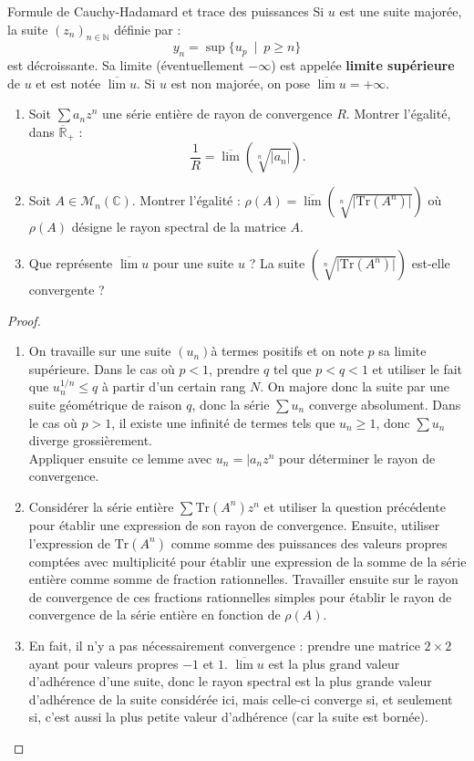 \documentclass[french]{book}
\newcommand{\N}{\mathbb{N}}
\newcommand{\R}{\mathbb{R}}
\newcommand{\C}{\mathbb{C}}
\newcommand{\Tr}{\text{Tr}}
\theoremstyle{definition}
\theoremstyle{remark}
\begin{document}
\begin{exo}[1]{Formule de Cauchy-Hadamard et trace des puissances}
	Si $u$ est une suite majorée, la suite $(z_n)_{n\in\N}$ définie par : $$y_n=\sup\{u_p\ \mid\ p\geqslant n\}$$ est décroissante. Sa limite (éventuellement $-\infty$) est appelée \textbf{limite supérieure} de $u$ et est notée $\overline{\lim}u$.	Si $u$ est non majorée, on pose $\overline{\lim}u=+\infty$.
	\begin{enumerate}
		\item Soit $\displaystyle\sum a_n z^n$ une série entière de rayon de convergence $R$. Montrer l'égalité, dans $\overline{\R}_+$ :
		$$\frac{1}{R}=\overline{\lim}(\sqrt[n]{\lvert a_n\rvert}).$$
		\item Soit $A\in\mathcal{M}_n(\C)$. Montrer l'égalité :
		$\rho(A)=\overline{\lim}(\sqrt[n]{\lvert\Tr(A^n)\rvert})$ où $\rho(A)$ désigne le rayon spectral de la matrice $A$.
		\item Que représente $\overline{\lim}u$ pour une suite $u$ ? La suite $\left(\sqrt[n]{\lvert\Tr(A^n)\rvert}\right)$ est-elle convergente ?
	\end{enumerate}
\end{exo}
\begin{proof}
	\begin{enumerate}
		\item On travaille sur une suite $(u_n)$à termes positifs et on note $p$ sa limite supérieure. Dans le cas où $p<1$, prendre $q$ tel que $p<q<1$ et utiliser le fait que $u_n^{1/n}\leqslant q$ à partir d'un certain rang $N$. On majore donc la suite par une suite géométrique de raison $q$, donc la série $\displaystyle\sum u_n$ converge absolument. Dans le cas où $p>1$, il existe une infinité de termes tels que $u_n\geqslant 1$, donc $\displaystyle\sum u_n$ diverge grossièrement. \\
		Appliquer ensuite ce lemme avec $u_n=\lvert a_n z^n$ pour déterminer le rayon de convergence.
		\item Considérer la série entière $\displaystyle\sum\Tr(A^n)z^n$ et utiliser la question précédente pour établir une expression de son rayon de convergence. Ensuite, utiliser l'expression de $\Tr(A^n)$ comme somme des puissances des valeurs propres comptées avec multiplicité pour établir une expression de la somme de la série entière comme somme de fraction rationnelles. Travailler ensuite sur le rayon de convergence de ces fractions rationnelles simples pour établir le rayon de convergence de la série entière en fonction de $\rho(A)$.
		\item En fait, il n'y a pas nécessairement convergence : prendre une matrice $2\times 2$ ayant pour valeurs propres $-1$ et $1$. $\overline{\lim}u$ est la plus grand valeur d'adhérence d'une suite, donc le rayon spectral est la plus grande valeur d'adhérence de la suite considérée ici, mais celle-ci converge si, et seulement si, c'est aussi la plus petite valeur d'adhérence (car la suite est bornée).
	\end{enumerate}
\end{proof}
\end{document}
